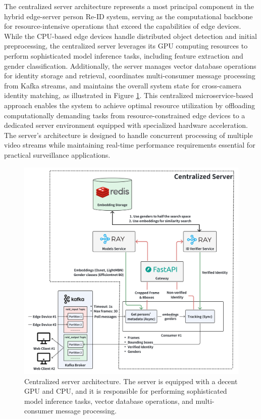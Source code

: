 The centralized server architecture represents a most principal component in the hybrid edge-server person Re-ID system, serving as the computational backbone for resource-intensive operations that exceed the capabilities of edge devices. While the CPU-based edge devices handle distributed object detection and initial preprocessing, the centralized server leverages its GPU computing resources to perform sophisticated model inference tasks, including feature extraction and gender classification. Additionally, the server manages vector database operations for identity storage and retrieval, coordinates multi-consumer message processing from Kafka streams, and maintains the overall system state for cross-camera identity matching, as illustrated in Figure \ref{fig:centralized_server_overview}. This centralized microservice-based approach enables the system to achieve optimal resource utilization by offloading computationally demanding tasks from resource-constrained edge devices to a dedicated server environment equipped with specialized hardware acceleration. The server's architecture is designed to handle concurrent processing of multiple video streams while maintaining real-time performance requirements essential for practical surveillance applications.

\newpage

\begin{figure}[!htbp]
    \centering
    \includegraphics[width=1.1\textwidth]{Figure/centralized_overview.png}
    \caption{Centralized server architecture. The server is equipped with a decent GPU and CPU, and it is responsible for performing sophisticated model inference tasks, vector database operations, and multi-consumer message processing.}
    \label{fig:centralized_server_overview}
\end{figure}

